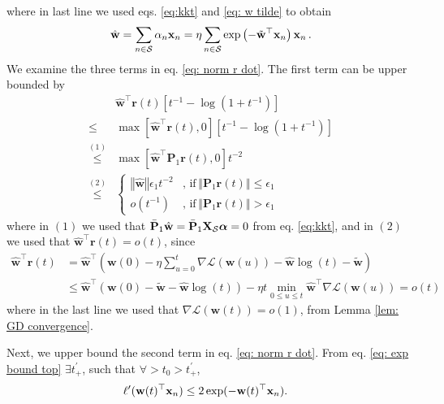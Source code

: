 \documentclass[twoside,11pt,english]{article}
\begin{document}
where in last line we used eqs. \ref{eq:kkt} and \ref{eq: w tilde}
to obtain 
\[
\hat{\mathbf{w}}=\sum_{n\in\mathcal{S}}\alpha_{n}\mathbf{x}_{n}=\eta\sum_{n\in\mathcal{S}}\exp\left(-\tilde{\mathbf{w}}^{\top}\mathbf{x}_{n}\right)\mathbf{x}_{n}\,.
\]
We examine the three terms in eq. \ref{eq: norm r dot}. The first
term can be upper bounded by 
\begin{align}
 & \hat{\mathbf{w}}^{\top}\mathbf{r}\left(t\right)\left[t^{-1}-\log\left(1+t^{-1}\right)\right]\nonumber \\
\leq & \max\left[\hat{\mathbf{w}}^{\top}\mathbf{r}\left(t\right),0\right]\left[t^{-1}-\log\left(1+t^{-1}\right)\right]\nonumber \\
\overset{\left(1\right)}{\leq} & \max\left[\hat{\mathbf{w}}^{\top}\mathbf{P}_{1}\mathbf{r}\left(t\right),0\right]t^{-2}\nonumber \\
\overset{\left(2\right)}{\leq} & \begin{cases}
\mathbf{\left\Vert \hat{\mathbf{w}}\right\Vert }\epsilon_{1}t^{-2} & ,\,\mathrm{if}\,\left\Vert \mathbf{P}_{1}\mathbf{r}\left(t\right)\right\Vert \leq\epsilon_{1}\\
o\left(t^{-1}\right) & ,\,\mathrm{if}\,\left\Vert \mathbf{P}_{1}\mathbf{r}\left(t\right)\right\Vert >\epsilon_{1}
\end{cases}\label{eq: w_hat r bound 1}
\end{align}
where in $\left(1\right)$ we used that $\bar{\mathbf{P}}_{1}\hat{\mathbf{w}}=\bar{\mathbf{P}}_{1}\mathbf{X}_{\mathcal{S}}\boldsymbol{\alpha}=0$
from eq. \ref{eq:kkt}, and in $\left(2\right)$ we used that $\hat{\mathbf{w}}^{\top}\mathbf{r}\left(t\right)=o\left(t\right)$,
since 
\begin{align*}
\hat{\mathbf{w}}^{\top}\mathbf{r}\left(t\right) & =\hat{\mathbf{w}}^{\top}\left(\mathbf{w}\left(0\right)-\eta\sum_{u=0}^{t}\nabla\mathcal{L}\left(\mathbf{w}\left(u\right)\right)-\hat{\mathbf{w}}\log\left(t\right)-\tilde{\mathbf{w}}\right)\\
 & \leq\hat{\mathbf{w}}^{\top}\left(\mathbf{w}\left(0\right)-\tilde{\mathbf{w}}-\hat{\mathbf{w}}\log\left(t\right)\right)-\eta t\min_{0\leq u\leq t}\hat{\mathbf{w}}^{\top}\nabla\mathcal{L}\left(\mathbf{w}\left(u\right)\right)=o\left(t\right)
\end{align*}
where in the last line we used that $\nabla\mathcal{L}\left(\mathbf{w}\left(t\right)\right)=o\left(1\right)$,
from Lemma \ref{lem: GD convergence}.

Next, we upper bound the second term in eq. \ref{eq: norm r dot}. From eq. \ref{eq: exp bound top} $\exists t_+^{\prime}$, such that $\forall >t_0>t_+^{\prime}$, 
\begin{align}
&\ell'(\mathbf{w}(t)^\top \mathbf{x}_{n})\le 2\exp(-\mathbf{w}(t)^\top \mathbf{x}_{n}).\label{eq: two factor inequality}
\end{align}
\end{document}
